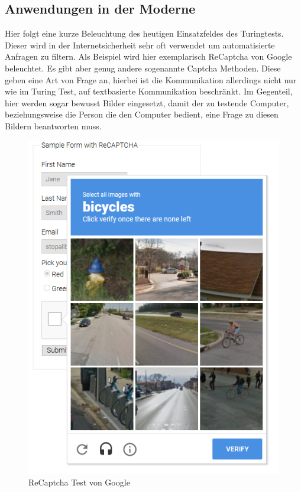 \subsection{Anwendungen in der Moderne}
Hier folgt eine kurze Beleuchtung des heutigen Einsatzfeldes des Turingtests. Dieser wird in der Internetsicherheit sehr oft verwendet um automatisierte Anfragen zu filtern. Als Beispiel wird hier exemplarisch ReCaptcha von Google beleuchtet. 
Es gibt aber genug andere sogenannte Captcha Methoden. Diese geben eine Art von Frage an, hierbei ist die Kommunikation allerdings nicht nur wie im Turing Test, auf textbasierte Kommunikation beschränkt. Im Gegenteil, hier werden sogar bewusst Bilder eingesetzt, damit der zu testende Computer, beziehungsweise die Person die den Computer bedient, eine Frage zu diesen Bildern beantworten muss.\newpage
\begin{figure}
\includegraphics[scale=0.5]{recaptcha.png}
\caption{ReCaptcha Test von Google \cite{captchapic}}
\label{fig:recaptcha}
\end{figure}
